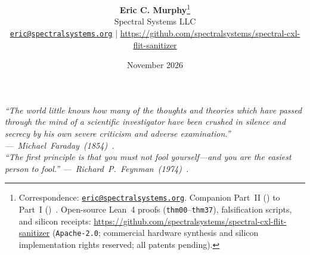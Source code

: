 \documentclass[10pt,twocolumn]{article}
\title{\vspace{-2.1em}{\fontsize{14.0}{16.8}\selectfont\bfseries\hyphenpenalty=10000\exhyphenpenalty=10000
Space-to-Time Capability Duality, Shadow-Bank B\'{e}zout Deflation,\\
and Split-Coset Syndrome Exactness for Disaggregated Memory Fabrics\par}
\vspace{0.22em}{\fontsize{10.2}{12.4}\selectfont\mdseries\itshape
Part~II (\ReleaseVersion): Adversarial Self-Critique, Lifecycle Closure, and Zero-Axiom Lean~4 Expansion\\
of the \textsc{Spectral Flit-Filter} (\BaselineVersion) Silicon Architecture\par}\vspace{-0.40em}}
\author{
  \textbf{Eric C. Murphy}\thanks{Correspondence: \href{mailto:eric@spectralsystems.org}{\texttt{eric@spectralsystems.org}}. Companion Part~II (\ReleaseVersion) to Part~I (\BaselineVersion)~\cite{murphy2026part1}. Open-source Lean~4 proofs (\texttt{thm00}--\texttt{thm37}), falsification scripts, and silicon receipts: \url{https://github.com/spectralsystems/spectral-cxl-flit-sanitizer} (\texttt{Apache-2.0}; commercial hardware synthesis and silicon implementation rights reserved; all patents pending).}\\
  {\small Spectral Systems LLC}\\
  {\footnotesize\href{mailto:eric@spectralsystems.org}{\texttt{eric@spectralsystems.org}} \;|\; \url{https://github.com/spectralsystems/spectral-cxl-flit-sanitizer}}
}
\date{\vspace{-0.35em}November 2026\vspace{-0.35em}}
\theoremstyle{spectralthm}
\begin{document}
\onecolumn
\maketitle
\thispagestyle{plain}

\vspace{-0.65em}
\begin{center}
\begin{minipage}{0.92\textwidth}
\centering\footnotesize\itshape
``The world little knows how many of the thoughts and theories which have passed through the mind of a scientific investigator have been crushed in silence and secrecy by his own severe criticism and adverse examination.'' ---~\upshape Michael~Faraday~(1854)~\cite{faraday1854mental}.\vspace{0.10em}\\
\itshape
``The first principle is that you must not fool yourself---and you are the easiest person to fool.'' ---~\upshape Richard~P.~Feynman~(1974)~\cite{feynman1974cargocult}.
\end{minipage}
\end{center}
\vspace{-0.25em}
\end{document}
